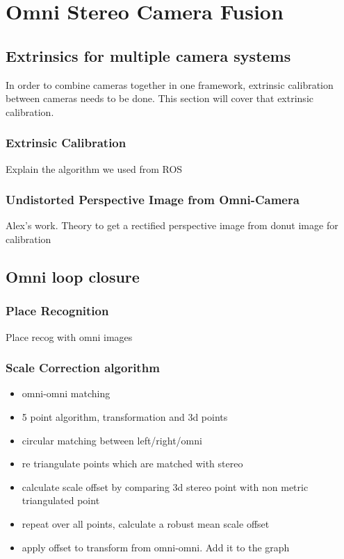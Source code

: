 \chapter{Omni Stereo Camera Fusion}
\label{chapter:omni_stereo_fusion}

\section{Extrinsics for multiple camera systems}

In order to combine cameras together in one framework, extrinsic calibration between cameras needs
to be done.  This section will cover that extrinsic calibration.

\subsection{Extrinsic Calibration}

Explain the algorithm we used from ROS

\subsection{Undistorted Perspective Image from Omni-Camera}

Alex's work.
Theory to get a rectified perspective image from donut image for calibration

\section{Omni loop closure}

\subsection{Place Recognition}

Place recog with omni images

\subsection{Scale Correction algorithm}

\begin{itemize}
\itemsep0em
 \item omni-omni matching
 \item 5 point algorithm, transformation and 3d points
 \item circular matching between left/right/omni
 \item re triangulate points which are matched with stereo
 \item calculate scale offset by comparing 3d stereo point with non metric triangulated point
 \item repeat over all points, calculate a robust mean scale offset
 \item apply offset to transform from omni-omni. Add it to the graph
\end{itemize}


